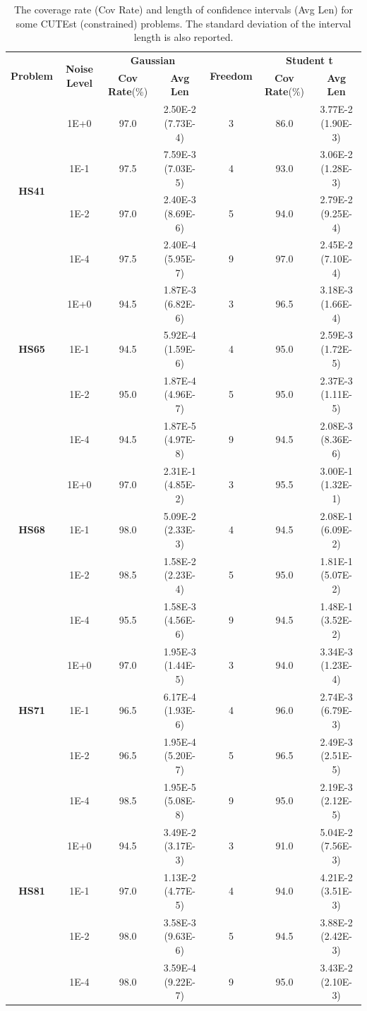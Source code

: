 \documentclass[aos]{imsart}
\numberwithin{equation}{section}
\theoremstyle{plain}
\begin{document}
\begin{table}[h]
  \centering
  \caption{The coverage rate (Cov Rate) and length of confidence intervals (Avg Len) for some CUTEst (constrained) problems. The standard deviation of the interval length is also reported.}
  \label{tab:cutest_covrate}
  \begin{tabular}{ccccccc}
    \hline
    \multirow{2}{*}{\textbf{Problem}} & \multirow{2}{*}{\textbf{Noise Level}} & \multicolumn{2}{c}{\textbf{Gaussian}} & \multirow{2}{*}{\textbf{Freedom}}  & \multicolumn{2}{c}{\textbf{Student t}} \\
    & & \textbf{Cov Rate}(\%) & \textbf{Avg Len} &  & \textbf{Cov Rate}(\%) & \textbf{Avg Len}\\
    \hline
    \multirow{4}{*}{\textbf{HS41}} & 1E+0 & 97.0 & 2.50E-2 (7.73E-4) & 3 & 86.0 & 3.77E-2 (1.90E-3) \\
    & 1E-1 & 97.5 & 7.59E-3 (7.03E-5) & 4 & 93.0 & 3.06E-2 (1.28E-3) \\
    & 1E-2 & 97.0 & 2.40E-3 (8.69E-6) & 5 & 94.0 & 2.79E-2 (9.25E-4)\\
    & 1E-4 & 97.5 & 2.40E-4 (5.95E-7)& 9 & 97.0 & 2.45E-2 (7.10E-4)\\
    \hline
    \multirow{3}{*}{\textbf{HS65}} & 1E+0 & 94.5 & 1.87E-3 (6.82E-6) & 3 & 96.5 & 3.18E-3 (1.66E-4)\\
    & 1E-1 & 94.5 & 5.92E-4 (1.59E-6) & 4 & 95.0 & 2.59E-3 (1.72E-5)\\
    & 1E-2 & 95.0 & 1.87E-4 (4.96E-7) & 5 & 95.0 & 2.37E-3 (1.11E-5)\\
    & 1E-4 & 94.5 & 1.87E-5 (4.97E-8) & 9 & 94.5 & 2.08E-3 (8.36E-6)\\
    \hline
    \multirow{3}{*}{\textbf{HS68}} & 1E+0 & 97.0 & 2.31E-1 (4.85E-2) & 3 & 95.5 & 3.00E-1 (1.32E-1)\\
    & 1E-1 & 98.0 & 5.09E-2 (2.33E-3) & 4 & 94.5 & 2.08E-1 (6.09E-2) \\
    & 1E-2 & 98.5 & 1.58E-2 (2.23E-4) & 5 & 95.0 & 1.81E-1 (5.07E-2)\\
    & 1E-4 & 95.5 & 1.58E-3 (4.56E-6) & 9 & 94.5 & 1.48E-1 (3.52E-2) \\
    \hline
    \multirow{3}{*}{\textbf{HS71}} & 1E+0 & 97.0 & 1.95E-3 (1.44E-5) & 3 & 94.0 & 3.34E-3 (1.23E-4)\\
    & 1E-1 & 96.5 &  6.17E-4 (1.93E-6) & 4 & 96.0 &  2.74E-3 (6.79E-3)\\
    & 1E-2 & 96.5 & 1.95E-4 (5.20E-7) & 5 & 96.5 & 2.49E-3 (2.51E-5)\\
    & 1E-4 & 98.5 & 1.95E-5 (5.08E-8) & 9 & 95.0 & 2.19E-3 (2.12E-5) \\
    \hline
    \multirow{3}{*}{\textbf{HS81}} & 1E+0 & 94.5 & 3.49E-2 (3.17E-3)  & 3 & 91.0 &  5.04E-2 (7.56E-3)\\
    & 1E-1 & 97.0 & 1.13E-2 (4.77E-5) & 4 & 94.0 & 4.21E-2 (3.51E-3)\\
    & 1E-2 & 98.0 &  3.58E-3 (9.63E-6) & 5 &  94.5 & 3.88E-2 (2.42E-3)\\
    & 1E-4 & 98.0 & 3.59E-4 (9.22E-7) & 9 &  95.0 & 3.43E-2 (2.10E-3) \\
    \hline
  \end{tabular}
\end{table}
\end{document}
